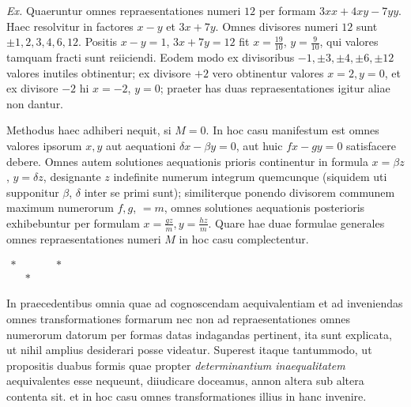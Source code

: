 \textit{Ex.} Quaeruntur omnes repraesentationes numeri $12$ per formam $3xx+4xy-7yy$. Haec resolvitur in factores $x-y$ et $3x+7y$. Omnes divisores numeri $12$ sunt $\pm1,2,3,4,6,12$. Positis $x-y=1$, $3x+7y=12$ fit $x=\frac{19}{10}$, $y=\frac9{10}$, qui valores tamquam fracti sunt reiiciendi. Eodem modo ex divisoribus $-1,\pm3,\pm4,\pm6,\pm12$ valores inutiles obtinentur; ex divisore $+2$ vero obtinentur valores $x=2,y=0$, et ex divisore $-2$ hi $x=-2$, $y=0$; praeter has duas repraesentationes igitur aliae non dantur.

Methodus haec adhiberi nequit, si $M=0$. In hoc casu manifestum est omnes valores ipsorum $x,y$ aut aequationi $\delta x-\beta y=0$, aut huic $fx-gy=0$ satisfacere debere. Omnes autem solutiones aequationis prioris continentur in formula $x=\beta z$, $y=\delta z$, designante $z$ indefinite numerum integrum quemcunque (siquidem uti supponitur $\beta$, $\delta$ inter se primi sunt); similiterque ponendo divisorem communem maximum numerorum $f,g$, $=m$, omnes solutiones aequationis posterioris exhibebuntur per formulam $x=\frac{gz}{m},y=\frac{hz}{m}$. Quare hae duae formulae generales omnes repraesentationes numeri $M$ in hoc casu complectentur.

\begin{center}
\(\begin{matrix} *&\qquad&*\\[-0.8ex]&*&\end{matrix}\)
\end{center}

In praecedentibus omnia quae ad cognoscendam aequivalentiam et ad inveniendas omnes transformationes formarum nec non ad repraesentationes omnes numerorum datorum per formas datas indagandas pertinent, ita sunt explicata, ut nihil amplius desiderari posse videatur. Superest itaque tantummodo, ut propositis duabus formis quae propter \textit{determinantium inaequalitatem} aequivalentes esse nequeunt, diiudicare doceamus, annon altera sub altera contenta sit. et in hoc casu omnes transformationes illius in hanc invenire.
